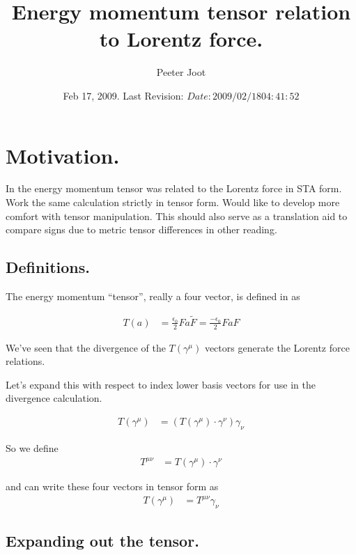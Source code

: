 \documentclass{article}
\title{ Energy momentum tensor relation to Lorentz force. }
\author{Peeter Joot}
\date{ Feb 17, 2009.  Last Revision: $Date: 2009/02/18 04:41:52 $ }
\begin{document}
\maketitle{}

\section{ Motivation. }

In \cite{PJstressEnergyLorentz} the energy momentum tensor was related
to the Lorentz force in STA form.  Work the same calculation strictly in
tensor form.  Would like to %
develop more comfort with tensor manipulation.  This should also serve
as a translation aid to compare signs due to metric tensor differences 
in other reading.

\subsection{ Definitions. }

The energy momentum ``tensor'', really a four vector, is defined
in \cite{doran2003gap}
as

\begin{align}
T(a) &= 
\frac{\epsilon_0}{2} F a \tilde{F} = \frac{-\epsilon_0}{2} F a {F} 
\end{align}

We've seen that the divergence of the $T(\gamma^\mu)$ vectors generate
the Lorentz force relations.

Let's expand this with respect to index lower basis vectors for use in the
divergence calculation.

\begin{align}
T(\gamma^\mu) &= (T(\gamma^\mu) \cdot \gamma^\nu) \gamma_\nu 
\end{align}

So we define
\begin{align}
T^{\mu \nu} 
&= T(\gamma^\mu) \cdot \gamma^\nu
\end{align}

and can write these four vectors in tensor form as
\begin{align}
T(\gamma^\mu) &= T^{\mu \nu} \gamma_\nu 
\end{align}

\subsection{ Expanding out the tensor. }
\end{document}
